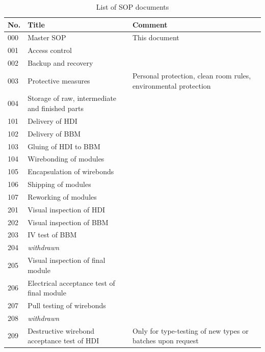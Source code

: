 \documentclass[12pt]{unlsilabsop}
\begin{document}
\begin{table}[hH]
\begin{center}
\caption{List of SOP documents}
\label{tbl:SOPlist}

\bigskip

{\footnotesize
\begin{tabular}{lp{7cm}p{6cm}}
\toprule
No. & Title & Comment \\
\midrule
000 & Master SOP & This document \\
\midrule
001 & Access control & \\
002 & Backup and recovery & \\
003 & Protective measures & Personal protection, clean room rules, environmental protection \\
004 & Storage of raw, intermediate and finished parts & \\
\midrule
101 & Delivery of HDI & \\
102 & Delivery of BBM & \\
103 & Gluing of HDI to BBM & \\
104 & Wirebonding of modules & \\
105 & Encapsulation of wirebonds & \\
106 & Shipping of modules & \\
107 & Reworking of modules & \\
\midrule
201 & Visual inspection of HDI & \\
202 & Visual inspection of BBM & \\
203 & IV test of BBM & \\
204 & \emph{withdrawn} & \\ %
205 & Visual inspection of final module & \\
206 & Electrical acceptance test of final module & \\
207 & Pull testing of wirebonds & \\
208 & \emph{withdrawn} & \\ %
209 & Destructive wirebond acceptance test of HDI & Only for type-testing of new types or batches upon request \\

\end{tabular}}
\end{center}
\end{table}
\end{document}
